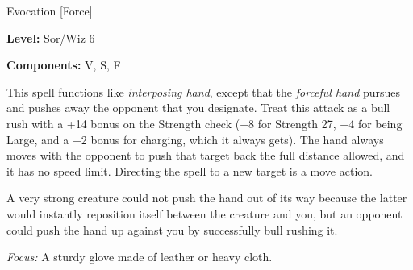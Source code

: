 
Evocation [Force]

\textbf{Level:} Sor/Wiz 6

\textbf{Components:} V, S, F

This spell functions like \textit{interposing hand}, except that the \textit{forceful 
hand} pursues and pushes away the opponent that you designate. Treat this attack 
as a bull rush with a +14 bonus on the Strength check (+8 for Strength 27, +4 for 
being Large, and a +2 bonus for charging, which it always gets). The hand always 
moves with the opponent to push that target back the full distance allowed, and 
it has no speed limit. Directing the spell to a new target is a move action.

A very strong creature could not push the hand out of its way because the latter 
would instantly reposition itself between the creature and you, but an opponent 
could push the hand up against you by successfully bull rushing it.

\textit{Focus:} A sturdy glove made of leather or heavy cloth.

